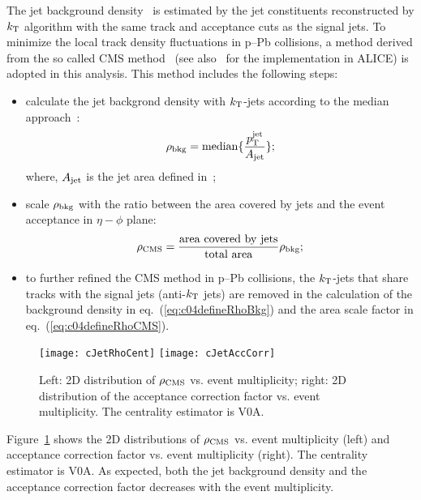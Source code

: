 The jet background density~\cite{Cacciari:2007fd,Cacciari:2008gn}
is estimated by the jet constituents reconstructed by $k_{\rm T}$ algorithm with the
same track and acceptance cuts as the signal jets.
To minimize the local track density fluctuations in p--Pb collisions,
a method derived from the so called CMS method~\cite{Chatrchyan:2012tt} (see
also~\cite{Ali2013:ana933} for the implementation in ALICE) is adopted
in this analysis.
This method includes the following steps:
\begin{itemize}
\item calculate the jet backgrond density with $k_{\rm T}$-jets according to the
      median approach~\cite{Cacciari:2007fd}:
      \begin{equation}\label{eq:c04defineRhoBkg}
      \rho_{\rm bkg}={\rm median}\{\frac{p_{\rm T}^{\rm jet}}{A_{\rm jet}}\};
      \end{equation}
      where, $A_{\rm jet}$ is the jet area defined in~\cite{Cacciari:2008gn};
\item scale $\rho_{\rm bkg}$ with the ratio between the area covered by jets
      and the event acceptance in $\eta-\phi$ plane:
      \begin{equation}\label{eq:c04defineRhoCMS}
      \rho_{\rm CMS}=\frac{\rm area~covered~by~jets}{\rm total~area}
                     \rho_{\rm bkg};
      \end{equation}
\item to further refined the CMS method in p--Pb collisions,
      the $k_{\rm T}$-jets that share tracks with the signal jets (anti-$k_{\rm T}$ jets)
      are removed in the calculation of the background density in
      eq.~(\ref{eq:c04defineRhoBkg}) and the area scale factor
      in eq.~(\ref{eq:c04defineRhoCMS}).
\end{itemize}

\begin{figure}[htb]
\begin{center}
\texttt{[image: cJetRhoCent]}
\texttt{[image: cJetAccCorr]}
\caption{Left: 2D distribution of $\rho_{\rm CMS}$ vs. event multiplicity;
         right: 2D distribution of the acceptance correction factor vs.
         event multiplicity.
         The centrality estimator is V0A.}
\label{fig:c04BkgRhoCent}
\end{center}
\end{figure}

Figure~\ref{fig:c04BkgRhoCent} shows
the 2D distributions of $\rho_{\rm CMS}$ vs. event multiplicity (left)
and acceptance correction factor vs. event multiplicity (right).
The centrality estimator is V0A.
As expected, both the jet background density and the acceptance correction
factor decreases with the event multiplicity.

